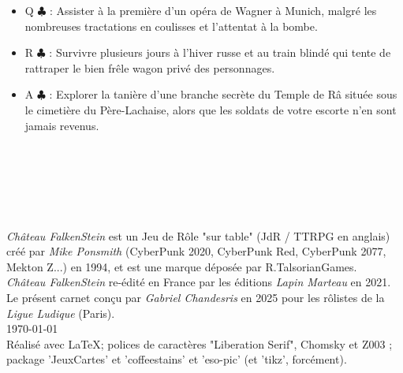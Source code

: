 \documentclass[a5paper,pagesize,french]{book}
\def\backgroundStampOnPage{%
	\begin{tikzpicture}[opacity=0.25] %
		\begin{scope}[xshift=-15.00,yshift=-8.00]
			\draw [very thick, blue   ] (-1.50, 0.00) ..controls +(0, 2) and +(0, 2).. ( 1.50, 0.00);
			\draw [very thick, red    ] (-1.50, 0.00) ..controls +(0,-2) and +(0,-2).. ( 1.50, 0.00);
			\draw [very thick, green  ] (-1.50, 0.00) ..controls +(0, 2) and +(0,-2).. ( 1.50, 0.00);
			\draw [very thick, magenta] (-1.00, 1.00) ..controls +(0, 2) and +(0,-2).. ( 1.00,-1.00);
			\draw [very thick, yellow ] ( 0.00, 1.50) ..controls +(0, 2) and +(0,-2).. ( 0.00,-1.50);
			\draw [very thick, black  ] (-1.50, 0.00) ..controls +(0,-2) and +(0, 2).. ( 1.50, 0.00);
			\draw [very thick, cyan   ] ( 1.00, 1.00) ..controls +(0, 2) and +(0,-2).. (-1.00,-1.00);
			\draw [very thick, gray, fill=white] (0.00,0.00) circle (0.75);
			\draw [very thick, white, fill=gray] (0.00,0.00) circle (0.25);
		\end{scope}
	\end{tikzpicture}
}%
\begin{document}
\begin{itemize}
	\item[] Q{ $\clubsuit$ } : Assister à la première d'un opéra de Wagner à Munich, malgré les nombreuses tractations en coulisses et l'attentat à la bombe.
	\item[] R{ $\clubsuit$ } : Survivre plusieurs jours à l'hiver russe et au train blindé qui tente de rattraper le bien frêle wagon privé des personnages.
	\item[] A{ $\clubsuit$ } : Explorer la tanière d'une branche secrète du Temple de Râ située sous le cimetière du Père-Lachaise, alors que les soldats de votre escorte n'en sont jamais revenus.
\end{itemize}~\\

\clearpage


~\\ \dotfill~\\

~\\

\hfill

\emph{Château FalkenStein} est un Jeu de Rôle "sur table" (JdR / TTRPG en anglais) créé par \emph{Mike Ponsmith} (CyberPunk 2020, CyberPunk Red, CyberPunk 2077, Mekton Z...) en 1994, et est une marque déposée par R.TalsorianGames.~\\
\emph{Château FalkenStein} re-édité en France par les éditions \emph{Lapin Marteau} en 2021.~\\

Le présent carnet conçu par \emph{Gabriel Chandesris} en 2025 pour les rôlistes de la \emph{Ligue Ludique} (Paris).~\\
\today~\\

Réalisé avec \LaTeX ; polices de caractères "Liberation Serif", {\setmainfont{Chomsky} Chomsky } et { \setmainfont{Z003} Z003 } ; package 'JeuxCartes' et 'coffeestains' et 'eso-pic' (et 'tikz', forcément).~\\

\dotfill~\\

 \hfill %
%
 \hfill %
%
~\\

\dotfill~\\
\end{document}
